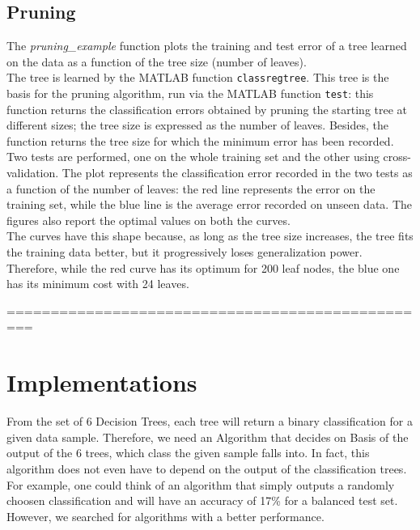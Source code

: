 \documentclass{article}
\begin{document}
\subsection{Pruning}
The \emph{pruning\_example} function plots the training and test error of a tree learned on the data as a function of the tree size (number of leaves).\\
The tree is learned by the MATLAB function \verb$classregtree$. This tree is the basis for the pruning algorithm, run via the MATLAB function \verb$test$: this function returns the classification errors obtained by pruning the starting tree at different sizes; the tree size is expressed as the number of leaves. Besides, the function returns the tree size for which the minimum error has been recorded.\\
Two tests are performed, one on the whole training set and the other using cross-validation. 
The plot represents the classification error recorded in the two tests as a function of the number of leaves: the red line represents the error on the training set, while the blue line is the average error recorded on unseen data. The figures also report the optimal values on both the curves.\\
The curves have this shape because, as long as the tree size increases, the tree fits the training data better, but it progressively loses generalization power. Therefore, while the red curve has its optimum for 200 leaf nodes, the blue one has its minimum cost with 24 leaves.



=================================================
\section{Implementations}
From the set of 6 Decision Trees, each tree will return a binary classification for a given data sample. Therefore, we need an Algorithm that decides on Basis of the output of the 6 trees, which class the given sample falls into. In fact, this algorithm does not even have to depend on the output of the classification trees. For example, one could think of an algorithm that simply outputs a randomly choosen classification and will have an accuracy of 17\% for a balanced test set. However, we searched for algorithms with a better performance.
\end{document}
